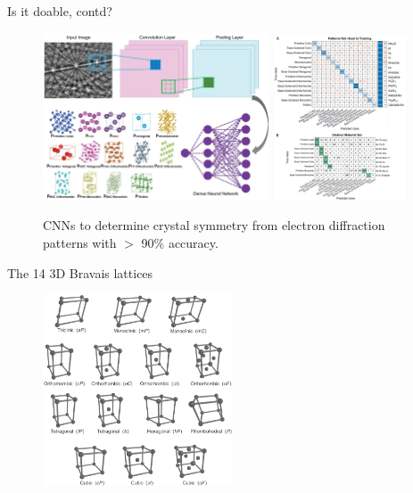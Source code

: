 \documentclass[aspectratio=169]{beamer}
\begin{document}
\begin{frame}{Is it doable, contd?}
\begin{figure}
    \centering
    \includegraphics[width=0.6\textwidth]{figures/science-cnn-electron-diffraction.jpg}
    \includegraphics[width=0.35\textwidth]{figures/science-cnn-electron-diffraction2.jpg}
    \caption{CNNs to determine crystal symmetry from electron diffraction patterns with $>$ 90\% accuracy.\cite{kaufmannCrystalSymmetryDetermination2020}}
\end{figure}
\end{frame}


\begin{frame}{The 14 3D Bravais lattices}
\begin{figure}
    \includegraphics[width=0.5\textwidth]{figures/bravais_lattices.png}
\end{figure}
\end{frame}
\end{document}
